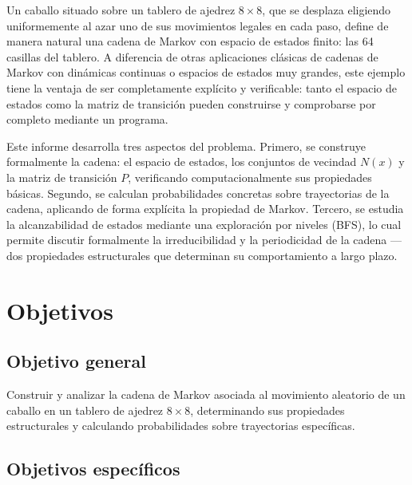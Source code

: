\documentclass[12pt,a4paper]{article}
\begin{document}
Un caballo situado sobre un tablero de ajedrez \(8\times8\), que se
desplaza eligiendo uniformemente al azar uno de sus movimientos legales
en cada paso, define de manera natural una cadena de Markov con espacio
de estados finito: las 64 casillas del tablero. A diferencia de otras
aplicaciones clásicas de cadenas de Markov con dinámicas continuas o
espacios de estados muy grandes, este ejemplo tiene la ventaja de ser
completamente explícito y verificable: tanto el espacio de estados como
la matriz de transición pueden construirse y comprobarse por completo
mediante un programa.

Este informe desarrolla tres aspectos del problema. Primero, se
construye formalmente la cadena: el espacio de estados, los conjuntos
de vecindad \(N(x)\) y la matriz de transición \(P\), verificando
computacionalmente sus propiedades básicas. Segundo, se calculan
probabilidades concretas sobre trayectorias de la cadena, aplicando de
forma explícita la propiedad de Markov. Tercero, se estudia la
alcanzabilidad de estados mediante una exploración por niveles (BFS),
lo cual permite discutir formalmente la irreducibilidad y la
periodicidad de la cadena --- dos propiedades estructurales que
determinan su comportamiento a largo plazo.


\section{Objetivos}

\subsection{Objetivo general}

Construir y analizar la cadena de Markov asociada al movimiento
aleatorio de un caballo en un tablero de ajedrez \(8\times8\),
determinando sus propiedades estructurales y calculando probabilidades
sobre trayectorias específicas.

\subsection{Objetivos específicos}
\end{document}
